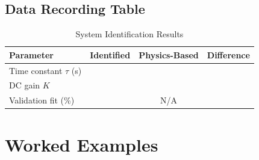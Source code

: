 \subsection{Data Recording Table}

\begin{table}[htbp]
\centering
\caption{System Identification Results}
\label{tab:sysid_results}
\begin{tabular}{lccc}
\toprule
\textbf{Parameter} & \textbf{Identified} & \textbf{Physics-Based} & \textbf{Difference} \\
\midrule
Time constant $\tau$ (s) & & & \\
DC gain $K$ & & & \\
Validation fit (\%) & & N/A & \\
\bottomrule
\end{tabular}
\end{table}

\section{Worked Examples}
\label{sec:sysid_examples}


